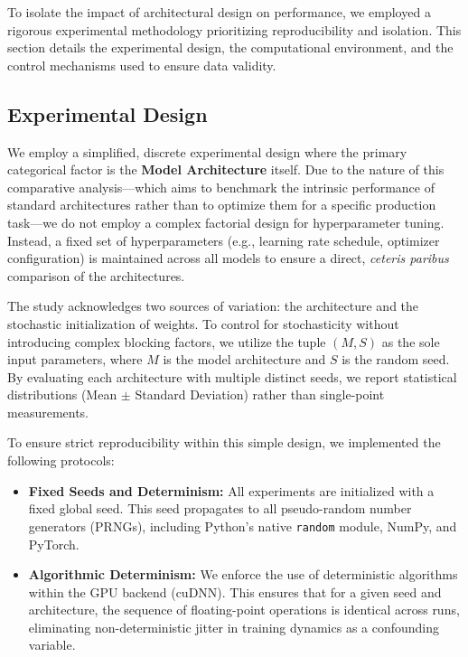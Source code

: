 \documentclass[acmsmall]{acmart}
\begin{document}
To isolate the impact of architectural design on performance, we employed a rigorous experimental methodology prioritizing reproducibility and isolation. This section details the experimental design, the computational environment, and the control mechanisms used to ensure data validity.

\subsection{Experimental Design}

We employ a simplified, discrete experimental design where the primary categorical factor is the \textbf{Model Architecture} itself. Due to the nature of this comparative analysis—which aims to benchmark the intrinsic performance of standard architectures rather than to optimize them for a specific production task—we do not employ a complex factorial design for hyperparameter tuning. Instead, a fixed set of hyperparameters (e.g., learning rate schedule, optimizer configuration) is maintained across all models to ensure a direct, \textit{ceteris paribus} comparison of the architectures.

The study acknowledges two sources of variation: the architecture and the stochastic initialization of weights. To control for stochasticity without introducing complex blocking factors, we utilize the tuple $(M, S)$ as the sole input parameters, where $M$ is the model architecture and $S$ is the random seed. By evaluating each architecture with multiple distinct seeds, we report statistical distributions (Mean $\pm$ Standard Deviation) rather than single-point measurements.

To ensure strict reproducibility within this simple design, we implemented the following protocols:
\begin{itemize}
    \item \textbf{Fixed Seeds and Determinism:} All experiments are initialized with a fixed global seed. This seed propagates to all pseudo-random number generators (PRNGs), including Python's native \texttt{random} module, NumPy, and PyTorch.
    \item \textbf{Algorithmic Determinism:} We enforce the use of deterministic algorithms within the GPU backend (cuDNN). This ensures that for a given seed and architecture, the sequence of floating-point operations is identical across runs, eliminating non-deterministic jitter in training dynamics as a confounding variable.
\end{itemize}
\end{document}
